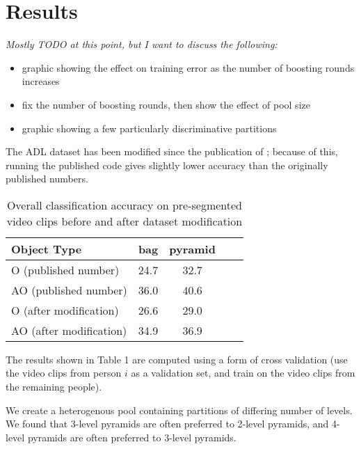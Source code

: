 \documentclass[10pt,twocolumn,letterpaper]{article}
\begin{document}
\section{Results}
\textit{Mostly TODO at this point, but I want to discuss the following:}
	\begin{itemize}
		\item graphic showing the effect on training error as the number of
				boosting rounds increases
		\item fix the number of boosting rounds, then show the effect of pool
				size
		\item graphic showing a few particularly discriminative partitions
	\end{itemize}
	The ADL dataset has been modified since the publication of
	\cite{Ramanan12}; because of this, running the published code gives
	slightly lower accuracy than the originally published numbers.

	
	\begin{table}
		\begin{center}
			\begin{tabular}{|l|c|c|c|c|}
				\hline
				Object Type & bag & pyramid  \\
				\hline\hline
				O (published number) & 24.7 & 32.7 \\
			 AO (published number) & 36.0 & 40.6 \\
				\hline\hline
				O (after modification) & 26.6 & 29.0 \\
 				AO (after modification) & 34.9 & 36.9 \\
				\hline
			\end{tabular}
		\end{center}
		\caption{Overall classification accuracy on pre-segmented video clips before and after dataset
		modification}
	\end{table}
	
	The results shown in Table 1 are computed using a form of cross
	validation (use the video clips from person $i$ as a validation set, and
	train on the video clips from the remaining people).
	
	We create a heterogenous pool containing partitions of differing number of
	levels. We found that 3-level pyramids are often preferred to 2-level
	pyramids, and 4-level pyramids are often preferred to 3-level pyramids. 
	
\end{document}
